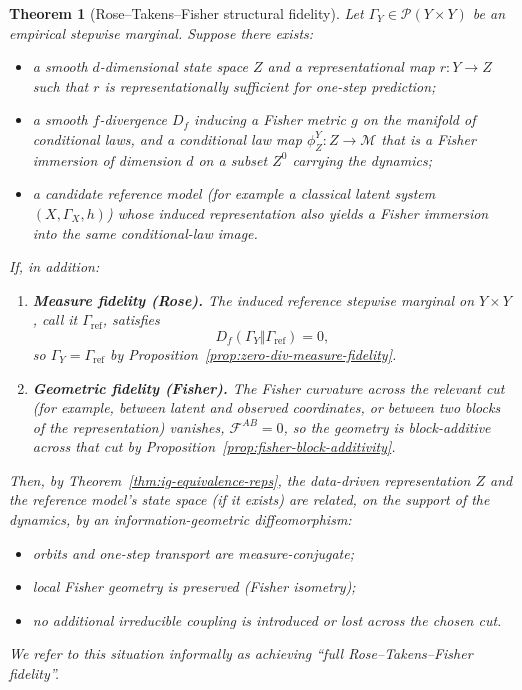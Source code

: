 \documentclass[11pt]{article}
\newtheorem{theorem}{Theorem}
\newcommand{\1}{\mathbf{1}}
\begin{document}
\begin{theorem}[Rose--Takens--Fisher structural fidelity]
\label{thm:RTF-structural}
Let $\Gamma_Y \in \mathcal{P}(Y \times Y)$ be an empirical
stepwise marginal. Suppose there exists:
\begin{itemize}[leftmargin=1.6em]
  \item a smooth $d$-dimensional state space $Z$ and a representational map
        $r:Y \to Z$ such that $r$ is representationally sufficient for one-step
        prediction;
  \item a smooth $f$-divergence $D_f$ inducing a Fisher metric $g$ on the
        manifold of conditional laws, and a conditional law map
        $\phi_Z^Y: Z \to \mathcal{M}$ that is a Fisher immersion of dimension $d$
        on a subset $Z^0$ carrying the dynamics;
  \item a candidate reference model (for example a classical latent system
        $(X,\Gamma_X,h)$) whose induced representation also yields a Fisher immersion
        into the same conditional-law image.
\end{itemize}

If, in addition:
\begin{enumerate}[label=(F\arabic*),leftmargin=1.8em]
  \item \textbf{Measure fidelity (Rose).}
    The induced reference stepwise marginal on $Y\times Y$, call it $\Gamma_{\mathrm{ref}}$,
    satisfies
    \[
      D_f(\Gamma_Y \Vert \Gamma_{\mathrm{ref}}) = 0,
    \]
    so $\Gamma_Y = \Gamma_{\mathrm{ref}}$ by
    Proposition~\ref{prop:zero-div-measure-fidelity}.

  \item \textbf{Geometric fidelity (Fisher).}
    The Fisher curvature across the relevant cut (for example, between latent and
    observed coordinates, or between two blocks of the representation) vanishes,
    $\mathcal{F}^{AB} = 0$, so the geometry is block-additive across that cut by
    Proposition~\ref{prop:fisher-block-additivity}.
\end{enumerate}

Then, by Theorem~\ref{thm:ig-equivalence-reps}, the data-driven representation $Z$ and the reference model’s state space (if it exists) are related, on the support of the dynamics, by an information-geometric diffeomorphism:
\begin{itemize}[leftmargin=1.6em]
  \item orbits and one-step transport are measure-conjugate;
  \item local Fisher geometry is preserved (Fisher isometry);
  \item no additional irreducible coupling is introduced or lost across the chosen cut.
\end{itemize}

We refer to this situation informally as achieving ``full Rose--Takens--Fisher fidelity''.
\end{theorem}
\end{document}
